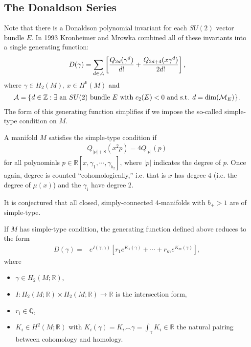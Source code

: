 \documentclass[12pt, onecolumn]{article}
\newenvironment{definition}[1][Definition]{\begin{trivlist}
\item[\hskip \labelsep {\bfseries #1}]}{\end{trivlist}}
\newenvironment{remark}[1][Remark]{\begin{trivlist}
\item[\hskip \labelsep {\bfseries #1}]}{\end{trivlist}}
\begin{document}
\subsection{The Donaldson Series}
\label{sec_Dseries}
Note that there is a Donaldson polynomial invariant for each $SU(2)$ vector bundle $E$.  In 1993 Kronheimer and Mrowka combined all of these invariants into a single generating function:
\begin{align*}
D(\gamma)=\sum_{d \in {\cal A}}\left[\frac{Q_{2d}(\gamma^{d})}{d!}+\frac{Q_{2d+4}(x \gamma^{d})}{2d!} \right],
\end{align*}
where $\gamma \in H_{2}(M),\,x \in H^{0}(M)$ and
\begin{align*}
{\cal A}=\left\{d \in \mathbb{Z}: \text{$\exists$ an $SU(2)$ bundle $E$ with $c_{2}(E)<0$ and s.t. $d=\text{dim}({\cal M}_{E})$} \right\}.
\end{align*}
The form of this generating function simplifies if we impose the so-called simple-type condition on $M$.
\begin{definition}
A manifold $M$ satisfies the simple-type condition if
\begin{align*}
Q_{|p|+8}(x^2p)=4Q_{|p|}(p)
\end{align*}
for all polynomials $p \in \mathbb{R}[x,\gamma_{1},\cdots,\gamma_{b_{2}}]$, where $|p|$ indicates the degree of $p$.  Once again, degree is counted ``cohomologically,'' i.e. that is $x$ has degree $4$ (i.e. the degree of $\mu(x)$) and the $\gamma_{i}$ have degree 2.
\end{definition}
\begin{remark}
It is conjectured that all closed, simply-connected 4-manifolds with $b_{+}>1$ are of simple-type.
\end{remark}
If $M$ has simple-type condition, the generating function defined above reduces to the form
\begin{align*}
D(\gamma)=&e^{I(\gamma,\gamma)}\left[r_{1}e^{K_{1}(\gamma)}+\cdots+r_{m}e^{K_{m}(\gamma)}\right],
\end{align*}
where
\begin{itemize}
\item $\gamma \in H_{2}(M;\mathbb{R})$,\\
\item $I:H_{2}(M;\mathbb{R}) \times H_{2}(M;\mathbb{R}) \rightarrow \mathbb{R}$ is the intersection form,
\item $r_{i} \in \mathbb{Q}$,\\
\item $K_{i} \in H^{2}(M;\mathbb{R})$ with $K_{i}(\gamma)=K_{i} \frown \gamma=\int_{\gamma}K_{i} \in \mathbb{R}$ the natural pairing between cohomology and homology.
\end{itemize}
\end{document}
